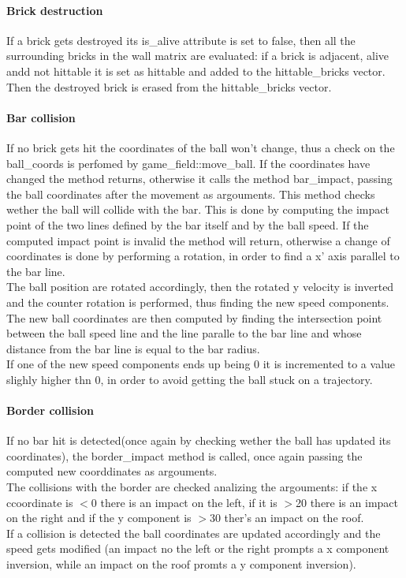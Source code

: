 \documentclass[]{article}
\begin{document}
\paragraph{Brick destruction}
If a brick gets destroyed its is\_alive attribute is set to false, then all the surrounding bricks in the wall matrix are evaluated: if a brick is adjacent, alive andd not hittable it is set as hittable and added to the hittable\_bricks vector.
Then the destroyed brick is erased from the hittable\_bricks vector.
\paragraph{Bar collision}
If no brick gets hit the coordinates of the ball won't change, thus a check on the ball\_coords is perfomed by game\_field::move\_ball. 
If the coordinates have changed the method returns, otherwise it calls the method bar\_impact, passing the ball coordinates after the movement as argouments. This method checks 
wether the ball will collide with the bar. This is done by computing the impact point of the two lines defined by the bar itself and by the ball speed.
If the computed impact point is invalid the method will return, otherwise a change of coordinates is done by performing a rotation, in order to find a x' axis parallel to the bar line.\\
The ball position are rotated accordingly, then the rotated y velocity is inverted and the counter rotation is performed, thus finding the new speed components.\\
The new ball coordinates are then computed by finding the intersection point between the ball speed line and the line paralle to the bar line and whose distance from the bar line is equal to the bar radius.\\
If one of the new speed components ends up being 0 it is incremented to a value slighly higher thn 0, in order to avoid getting the ball stuck on a trajectory.
\paragraph{Border collision}
If no bar hit is detected(once again by checking wether the ball has updated its coordinates), the border\_impact method is called, once again passing the computed new coorddinates as argouments.\\
The collisions with the border are checked analizing the argouments: if the x ccoordinate is $<$0 there is an impact on the left, if it is $>$20 there is an impact on the right and if the y component is $>$30 ther's an impact on the roof. \\
If a collision is detected the ball coordinates are updated accordingly and the speed gets modified (an impact no the left or the right prompts a x component inversion, while an impact on the roof promts a y component inversion).
\end{document}
